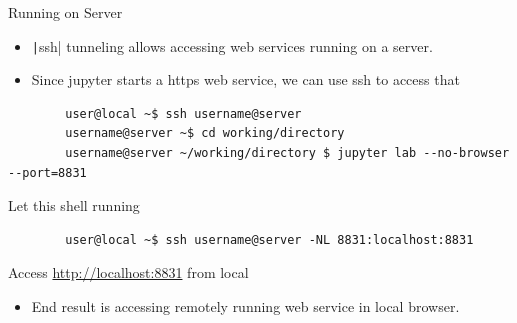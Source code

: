 \documentclass[aspectratio=169]{beamer}
\newcommand{\code}[2][python]{\texttt|#2|}
\begin{document}
\begin{frame}[fragile]{Running on Server}
    \begin{itemize}
        \item \code{ssh} tunneling allows accessing web services running on a server.
        \item Since jupyter starts a https web service, we can use ssh to access that
    \end{itemize}
    \begin{verbatim}
        user@local ~$ ssh username@server
        username@server ~$ cd working/directory
        username@server ~/working/directory $ jupyter lab --no-browser --port=8831
    \end{verbatim}
    Let this shell running
    \begin{verbatim}
        user@local ~$ ssh username@server -NL 8831:localhost:8831
    \end{verbatim}
    Access \url{http://localhost:8831} from local
    \begin{itemize}
        \item End result is accessing remotely running web service in local browser.
    \end{itemize}
\end{frame} 
%
\end{document}
